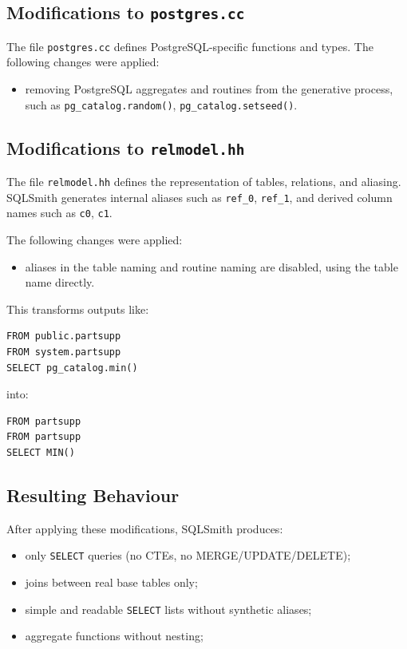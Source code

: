 \documentclass{article}
\begin{document}
\subsection{Modifications to \texttt{postgres.cc}}
The file \texttt{postgres.cc} defines PostgreSQL-specific functions and types.
The following changes were applied:
\begin{itemize}
    \item removing PostgreSQL aggregates and routines from the generative process,
          such as \texttt{pg\_catalog.random()}, \texttt{pg\_catalog.setseed()}.
\end{itemize}
\subsection{Modifications to \texttt{relmodel.hh}}
The file \texttt{relmodel.hh} defines the representation of tables,
relations, and aliasing.
SQLSmith generates internal aliases such as \texttt{ref\_0}, \texttt{ref\_1},
and derived column names such as \texttt{c0}, \texttt{c1}.

The following changes were applied:
\begin{itemize}
    \item aliases in the table naming and routine naming are disabled, using the table name directly.

\end{itemize}

This transforms outputs like:

\begin{lstlisting}
FROM public.partsupp
FROM system.partsupp 
SELECT pg_catalog.min()
\end{lstlisting}

into:

\begin{lstlisting}
FROM partsupp
FROM partsupp
SELECT MIN()
\end{lstlisting}


\subsection{Resulting Behaviour}
After applying these modifications, SQLSmith produces:
\begin{itemize}
    \item only \texttt{SELECT} queries (no CTEs, no MERGE/UPDATE/DELETE);
    \item joins between real base tables only;
    \item simple and readable \texttt{SELECT} lists without synthetic aliases;
    \item aggregate functions without nesting;
\end{itemize}
\end{document}
